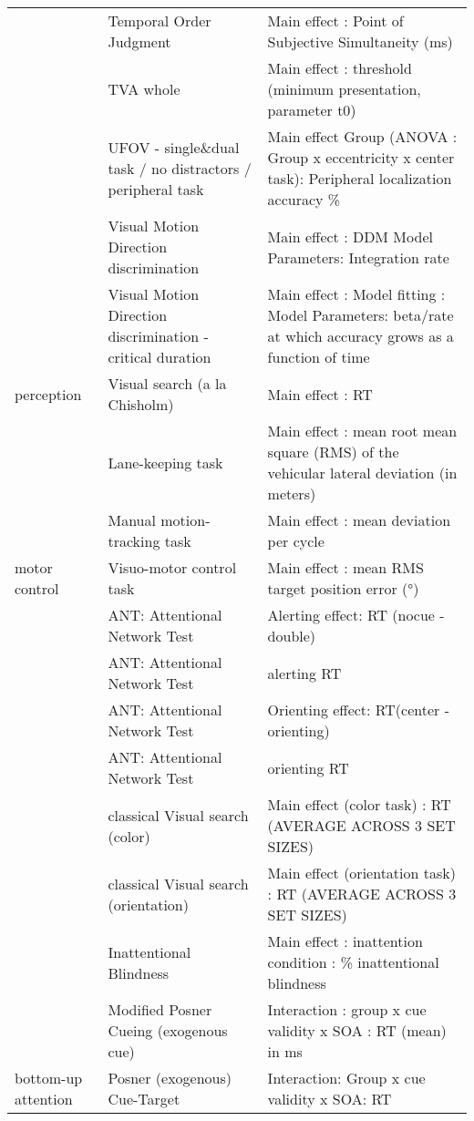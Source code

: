 \documentclass[
]{book}
\begin{document}
\begin{tabular}{l|l|l}
 & Temporal Order Judgment & Main effect : Point of Subjective Simultaneity (ms)\\
\cline{2-3}
 & TVA whole & Main effect : threshold (minimum presentation, parameter t0)\\
\cline{2-3}
 & UFOV - single\&dual task / no distractors / peripheral task & Main effect Group (ANOVA : Group x eccentricity x center task): Peripheral localization accuracy \%\\
\cline{2-3}
 & Visual Motion Direction discrimination & Main effect : DDM Model Parameters: Integration rate\\
\cline{2-3}
 & Visual Motion Direction discrimination - critical duration & Main effect : Model fitting : Model Parameters: beta/rate at which accuracy grows as a function of time\\
\cline{2-3}
\multirow[t]{-38}{*}{\raggedright\arraybackslash perception} & Visual search (a la Chisholm) & Main effect : RT\\
\cline{1-3}
 & Lane-keeping task & Main effect : mean root mean square (RMS) of the vehicular lateral deviation (in meters)\\
\cline{2-3}
 & Manual motion-tracking task & Main effect : mean deviation per cycle\\
\cline{2-3}
\multirow[t]{-3}{*}{\raggedright\arraybackslash motor control} & Visuo-motor control task & Main effect : mean RMS target position error (°)\\
\cline{1-3}
 & ANT: Attentional Network Test & Alerting effect: RT (nocue - double)\\
\cline{2-3}
 & ANT: Attentional Network Test & alerting RT\\
\cline{2-3}
 & ANT: Attentional Network Test & Orienting effect: RT(center - orienting)\\
\cline{2-3}
 & ANT: Attentional Network Test & orienting RT\\
\cline{2-3}
 & classical Visual search (color) & Main effect (color task) : RT (AVERAGE ACROSS 3 SET SIZES)\\
\cline{2-3}
 & classical Visual search (orientation) & Main effect (orientation task) : RT (AVERAGE ACROSS 3 SET SIZES)\\
\cline{2-3}
 & Inattentional Blindness & Main effect : inattention condition : \% inattentional blindness\\
\cline{2-3}
 & Modified Posner Cueing (exogenous cue) & Interaction : group x cue validity x SOA : RT (mean) in ms\\
\cline{2-3}
\multirow[t]{-9}{*}{\raggedright\arraybackslash bottom-up attention} & Posner (exogenous) Cue-Target & Interaction: Group x cue validity x SOA: RT\\

\end{tabular}
\end{document}
